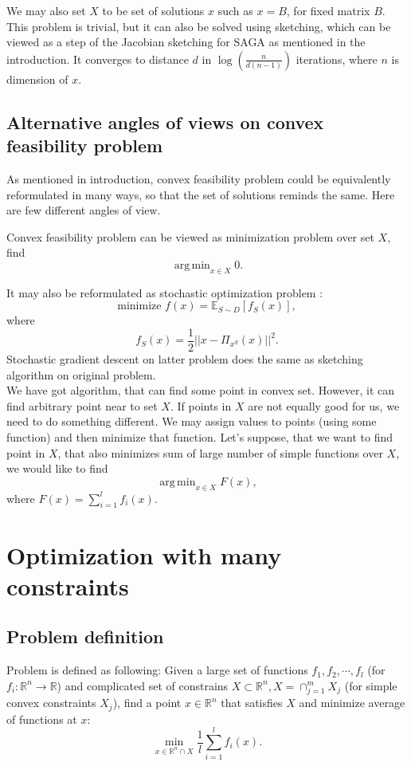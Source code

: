 \documentclass[11pt]{book}
\newcommand{\R}{\mathbb{R}}
\newcommand{\E}{\mathbb{E}}
\DeclareMathOperator*{\argmin}{arg\,min}
\begin{document}
We may also set $X$ to be set of solutions $x$ such as $x=B$, for fixed matrix $B$. This problem is trivial, but it can also be solved using sketching, which can be viewed as a step of the Jacobian sketching for SAGA as mentioned in the introduction. It converges to distance $d$ in $\log(\frac{n}{d(n-1)})$\label{xIsB} iterations, where $n$ is dimension of $x$.\\

\section{Alternative angles of views on convex feasibility problem}
As mentioned in introduction, convex feasibility problem could be equivalently reformulated in many ways, so that the set of solutions reminds the same. Here are few different angles of view.

Convex feasibility problem can be viewed as minimization problem over set $X$, find $$\argmin_{x \in X} 0.$$

It may also be reformulated as stochastic optimization problem \cite{sketchAndProject}: $$\text{minimize } f(x)=\E_{S \sim D}[f_S(x)],$$ where $$f_S(x) = \frac{1}{2}||x-\Pi_{x^S}(x)||^2.$$
Stochastic gradient descent on latter problem does the same as sketching algorithm on original problem.\\

We have got algorithm, that can find some point in convex set. However, it can find arbitrary point near to set $X$. If points in $X$ are not equally good for us, we need to do something different. We may assign values to points (using some function) and then minimize that function. Let's suppose, that we want to find point in $X$, that also minimizes sum of large number of simple functions over $X$, we would like to find $$\argmin_{x \in X} F(x),$$ where $F(x)=\sum_{i=1}^{l}f_i(x).$



\chapter{Optimization with many constraints}

\section{Problem definition}
Problem is defined as following: Given a large set of functions $f_1,f_2,\cdots,f_l$ (for $f_i: \R^n \rightarrow \R$) and complicated set of constrains $X \subset \R^n, X = \cap_{j=1}^m X_j$ (for simple convex constraints $X_j$), find a point $x \in \R^n$ that satisfies $X$ and minimize average of functions at $x$: $$ \min_{x \in \R^n \cap X} \frac{1}{l}\sum_{i=1}^l f_i(x).$$
\end{document}
